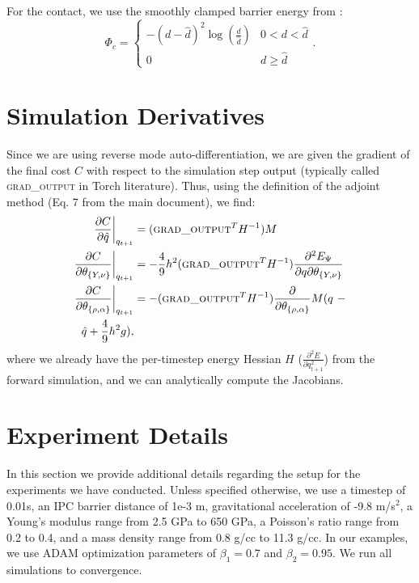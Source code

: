 For the contact, we use the smoothly clamped barrier energy from \citet{ipc}:
\begin{equation}
   \Phi_c = \begin{cases} 
      -(d-\hat{d})^2 \log{\left(\frac{d}{\hat{d}}\right)} & 0 < d < \hat{d} \\
      0 & d \geq \hat{d}
   \end{cases}.
\end{equation}

\section{Simulation Derivatives}\label{app:adjoint-derivs}
Since we are using reverse mode auto-differentiation, we are given the gradient of the final cost $C$ with respect to the simulation step output (typically called \textsc{grad\_output} in Torch literature).
Thus, using the definition of the adjoint method (Eq. 7 from the main document), we find:
\begin{equation}
\begin{split}
	\frac{\partial C }{\partial \hat{q}} \bigg\rvert_{q_{t+1}}&= (\textsc{grad\_output}^T H^{-1}) M \\
	\frac{\partial C}{\partial \theta_{\{Y, \nu\}}} \bigg\rvert_{q_{t+1}}&= -\frac{4}{9}h^2 (\textsc{grad\_output}^T H^{-1}) \frac{\partial^2 E_\Psi}{\partial q \partial \theta_{\{Y, \nu\}}} \\
	\frac{\partial C}{\partial \theta_{\{\rho, \alpha\}}} \bigg\rvert_{q_{t+1}}&= - (\textsc{grad\_output}^T H^{-1}) \frac{\partial}{\partial \theta_{\{\rho, \alpha\}}} M (q\ - \\ \hat{q} + \frac{4}{9}h^2 g),
\end{split}
\end{equation}
where we already have the per-timestep energy Hessian $H$ ($\frac{\partial^2 E}{\partial q_{t+1}^2}$) from the forward simulation, and we can analytically compute the Jacobians. %

\section{Experiment Details}
In this section we provide additional details regarding the setup for the experiments we have conducted. Unless specified otherwise, we use a timestep of 0.01s, an IPC barrier distance of 1e-3 m, gravitational acceleration of -9.8 m/s${}^2$, a Young's modulus range from 2.5 GPa to 650 GPa, a Poisson's ratio range from 0.2 to 0.4, and a mass density range from 0.8 g/cc to 11.3 g/cc. In our examples, we use ADAM optimization parameters of $\beta_1 = 0.7$ and $\beta_2 = 0.95$. We run all simulations to convergence.

